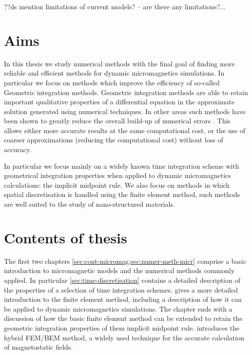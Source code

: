??ds mention limitations of current models? -- are there any limitations?...

\section{Aims}

In this thesis we study numerical methods with the final goal of finding more reliable and efficient methods for dynamic micromagnetics simulations.
In particular we focus on methods which improve the efficiency of so-called Geometric integration methods.
Geometric integration methods are able to retain important qualitative properties of a differential equation in the approximate solution generated using numerical techniques.
In other areas such methods have been shown to greatly reduce the overall build-up of numerical errors \cite[77]{Iserles2009}.
This allows either more accurate results at the same computational cost, or the use of coarser approximations (reducing the computational cost) without loss of accuracy.

In particular we focus mainly on a widely known time integration scheme with geometrical integration properties when applied to dynamic micromagnetics calculations: the implicit midpoint rule.
We also focus on methods in which spatial discretisation is handled using the finite element method, such methods are well suited to the study of nano-structured materials.



\section{Contents of thesis}

The first two chapters \cref{sec:cont-micromag,sec:numer-meth-micr} comprise a basic introduction to micromagnetic models and the numerical methods commonly applied.
In particular \cref{sec:time-discretisation} contains a detailed description of the properties of a selection of time integration schemes.
 gives a more detailed introduction to the finite element method, including a description of how it can be applied to dynamic micromagnetics simulations.
The chapter ends with a discussion of how the basic finite element method can be extended to retain the geometric integration properties of them implicit midpoint rule.
 introduces the hybrid FEM/BEM method, a widely used technique for the accurate calculation of magnetostatic fields.

